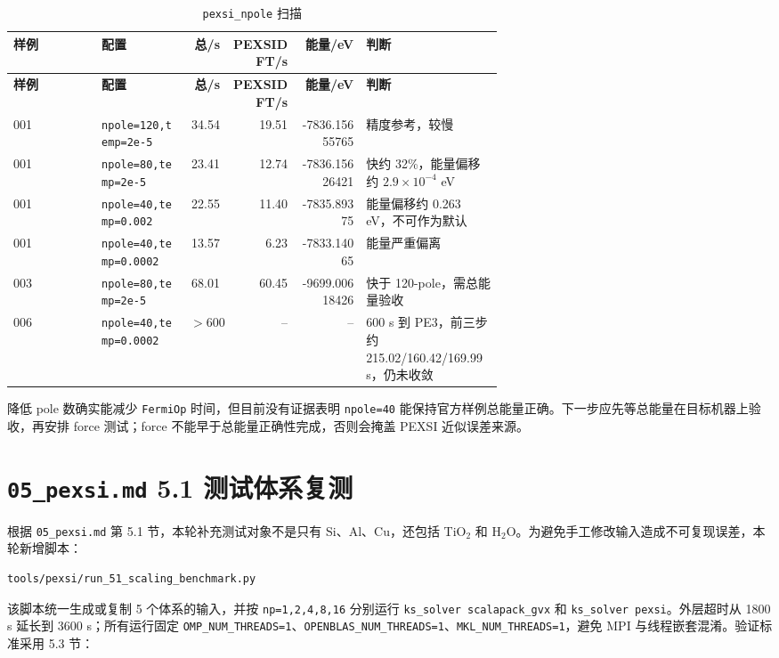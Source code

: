 \documentclass[a4paper,11pt]{article}
\newcommand{\code}[1]{\texttt{#1}}
\begin{document}
{\scriptsize
\begin{longtable}{@{}p{0.18\linewidth}p{0.18\linewidth}r r r p{0.28\linewidth}@{}}
\caption{\code{pexsi\_npole} 扫描}
\label{tab:npole-scan}\\
\toprule
\textbf{样例} & \textbf{配置} & \textbf{总/s} & \textbf{PEXSIDFT/s} & \textbf{能量/eV} & \textbf{判断}\\
\midrule
\endfirsthead
\toprule
\textbf{样例} & \textbf{配置} & \textbf{总/s} & \textbf{PEXSIDFT/s} & \textbf{能量/eV} & \textbf{判断}\\
\midrule
\endhead
001 & \code{npole=120,temp=2e-5} & 34.54 & 19.51 & -7836.15655765 & 精度参考，较慢\\
001 & \code{npole=80,temp=2e-5} & 23.41 & 12.74 & -7836.15626421 & 快约 32\%，能量偏移约 \(2.9\times10^{-4}\) eV\\
001 & \code{npole=40,temp=0.002} & 22.55 & 11.40 & -7835.89375 & 能量偏移约 0.263 eV，不可作为默认\\
001 & \code{npole=40,temp=0.0002} & 13.57 & 6.23 & -7833.14065 & 能量严重偏离\\
003 & \code{npole=80,temp=2e-5} & 68.01 & 60.45 & -9699.00618426 & 快于 120-pole，需总能量验收\\
006 & \code{npole=40,temp=0.0002} & \(>600\) & -- & -- & 600 s 到 PE3，前三步约 215.02/160.42/169.99 s，仍未收敛\\
\bottomrule
\end{longtable}
}

降低 pole 数确实能减少 \code{FermiOp} 时间，但目前没有证据表明 \code{npole=40} 能保持官方样例总能量正确。下一步应先等总能量在目标机器上验收，再安排 force 测试；force 不能早于总能量正确性完成，否则会掩盖 PEXSI 近似误差来源。

\section{\code{05\_pexsi.md} 5.1 测试体系复测}

根据 \code{05\_pexsi.md} 第 5.1 节，本轮补充测试对象不是只有 Si、Al、Cu，还包括 TiO\(_2\) 和 H\(_2\)O。为避免手工修改输入造成不可复现误差，本轮新增脚本：

\begin{verbatim}
tools/pexsi/run_51_scaling_benchmark.py
\end{verbatim}

该脚本统一生成或复制 5 个体系的输入，并按 \code{np=1,2,4,8,16} 分别运行 \code{ks\_solver scalapack\_gvx} 和 \code{ks\_solver pexsi}。外层超时从 1800 s 延长到 3600 s；所有运行固定 \code{OMP\_NUM\_THREADS=1}、\code{OPENBLAS\_NUM\_THREADS=1}、\code{MKL\_NUM\_THREADS=1}，避免 MPI 与线程嵌套混淆。验证标准采用 5.3 节：
\end{document}
